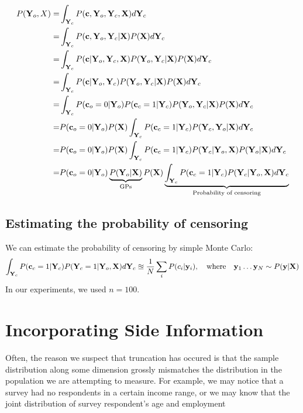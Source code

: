 \documentclass{article}
\begin{document}
\begin{align}
P(\mathbf{Y}_o , X) = & \int_{\mathbf{Y}_c} P( {\bf{c}}, \mathbf{Y}_o, \mathbf{Y}_c, \mathbf{X} ) d\mathbf{Y}_c \\
= & \int_{\mathbf{Y}_c} P( {\bf{c}}, \mathbf{Y}_o, \mathbf{Y}_c | \mathbf{X} ) P( \mathbf{X} ) d\mathbf{Y}_c \\
= & \int_{\mathbf{Y}_c} P( {\bf{c}} | \mathbf{Y}_o, \mathbf{Y}_c, \mathbf{X} ) P( \mathbf{Y}_o, \mathbf{Y}_c | \mathbf{X} ) P( \mathbf{X} ) d\mathbf{Y}_c \\
= & \int_{\mathbf{Y}_c} P( {\bf{c}} | \mathbf{Y}_o, \mathbf{Y}_c) P( \mathbf{Y}_o, \mathbf{Y}_c | \mathbf{X} ) P( \mathbf{X} ) d\mathbf{Y}_c \\
= & \int_{\mathbf{Y}_c} P( {\bf{c}}_o = 0 | \mathbf{Y}_o ) P( {\bf{c}}_c = 1 | \mathbf{Y}_c ) P( \mathbf{Y}_o, \mathbf{Y}_c | \mathbf{X} ) P( \mathbf{X} ) d\mathbf{Y}_c \\
= & P( {\bf{c}}_o = 0 | \mathbf{Y}_o ) P( \mathbf{X} ) \int_{\mathbf{Y}_c} P( {\bf{c}}_c = 1 | \mathbf{Y}_c ) P( \mathbf{Y}_c, \mathbf{Y}_o | \mathbf{X} ) d\mathbf{Y}_c  \\
= & P( {\bf{c}}_o = 0 | \mathbf{Y}_o ) P( \mathbf{X} ) \int_{\mathbf{Y}_c} P( {\bf{c}}_c = 1 | \mathbf{Y}_c ) P( \mathbf{Y}_c | \mathbf{Y}_o, \mathbf{X} ) P( \mathbf{Y}_o | \mathbf{X} ) d\mathbf{Y}_c  \\
= & P( {\bf{c}}_o = 0 | \mathbf{Y}_o ) \underbrace{P( \mathbf{Y}_o | \mathbf{X} )}_{\textrm{GPs}} P( \mathbf{X} ) \underbrace{\int_{\mathbf{Y}_c} P( {\bf{c}}_c = 1 | \mathbf{Y}_c ) P( \mathbf{Y}_c | \mathbf{Y}_o, \mathbf{X} ) d\mathbf{Y}_c }_{\textrm{Probability of censoring}}
\label{eqn:full_censoring_likelihood}
\end{align}

\subsection{Estimating the probability of censoring}

We can estimate the probability of censoring by simple Monte Carlo:
%
\begin{align}
\int_{\mathbf{Y}_c} P( {\bf{c}}_c = 1 | \mathbf{Y}_c ) P( \mathbf{Y}_c = 1 | \mathbf{Y}_o, \mathbf{X} ) d\mathbf{Y}_c \approxeq \frac{1}{N} \sum_i P(c_i | {\bf{y}}_i ), \quad \textrm{where} \quad {\bf{y}}_1 \dots {\bf{y}}_N \sim P({\bf{y}} | \mathbf{X} )
\end{align}
%
In our experiments, we used $n = 100$.

\section{Incorporating Side Information}

Often, the reason we suspect that truncation has occured is that the sample distribution along some dimension grossly mismatches the distribution in the population we are attempting to measure.  For example, we may notice that a survey had no respondents in a certain income range, or we may know that the joint distribution of survey respondent's age and employment
\end{document}
